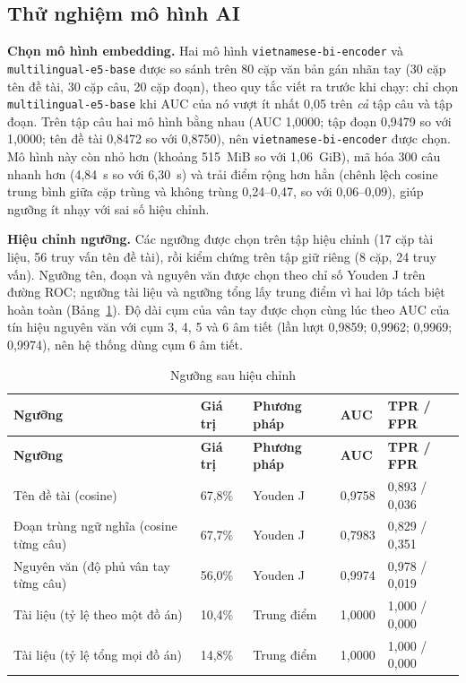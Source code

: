 \documentclass[../main.tex]{subfiles}
\begin{document}
\subsection{Thử nghiệm mô hình AI}

\textbf{Chọn mô hình embedding.} Hai mô hình \texttt{vietnamese-bi-encoder} và \texttt{multilingual-e5-base} được so sánh trên 80 cặp văn bản gán nhãn tay (30 cặp tên đề tài, 30 cặp câu, 20 cặp đoạn), theo quy tắc viết ra trước khi chạy: chỉ chọn \texttt{multilingual-e5-base} khi AUC của nó vượt ít nhất 0,05 trên \textit{cả} tập câu và tập đoạn. Trên tập câu hai mô hình bằng nhau (AUC 1,0000; tập đoạn 0,9479 so với 1,0000; tên đề tài 0,8472 so với 0,8750), nên \texttt{vietnamese-bi-encoder} được chọn. Mô hình này còn nhỏ hơn (khoảng 515~MiB so với 1,06~GiB), mã hóa 300 câu nhanh hơn (4,84~s so với 6,30~s) và trải điểm rộng hơn hẳn (chênh lệch cosine trung bình giữa cặp trùng và không trùng 0,24--0,47, so với 0,06--0,09), giúp ngưỡng ít nhạy với sai số hiệu chỉnh.

\textbf{Hiệu chỉnh ngưỡng.} Các ngưỡng được chọn trên tập hiệu chỉnh (17 cặp tài liệu, 56 truy vấn tên đề tài), rồi kiểm chứng trên tập giữ riêng (8 cặp, 24 truy vấn). Ngưỡng tên, đoạn và nguyên văn được chọn theo chỉ số Youden J trên đường ROC; ngưỡng tài liệu và ngưỡng tổng lấy trung điểm vì hai lớp tách biệt hoàn toàn (Bảng~\ref{tab:c4-nguong}). Độ dài cụm của vân tay được chọn cùng lúc theo AUC của tín hiệu nguyên văn với cụm 3, 4, 5 và 6 âm tiết (lần lượt 0,9859; 0,9962; 0,9969; 0,9974), nên hệ thống dùng cụm 6 âm tiết.

{\renewcommand{\arraystretch}{1.15}
\begin{longtable}{|p{4.3cm}|p{1.7cm}|p{3.1cm}|p{1.6cm}|p{3cm}|}
\caption{Ngưỡng sau hiệu chỉnh}\label{tab:c4-nguong}\\
\hline
\textbf{Ngưỡng} & \textbf{Giá trị} & \textbf{Phương pháp} & \textbf{AUC} & \textbf{TPR / FPR} \\
\hline
\endfirsthead
\hline
\textbf{Ngưỡng} & \textbf{Giá trị} & \textbf{Phương pháp} & \textbf{AUC} & \textbf{TPR / FPR} \\
\hline
\endhead
Tên đề tài (cosine) & 67,8\% & Youden J & 0,9758 & 0,893 / 0,036 \\
\hline
Đoạn trùng ngữ nghĩa (cosine từng câu) & 67,7\% & Youden J & 0,7983 & 0,829 / 0,351 \\
\hline
Nguyên văn (độ phủ vân tay từng câu) & 56,0\% & Youden J & 0,9974 & 0,978 / 0,019 \\
\hline
Tài liệu (tỷ lệ theo một đồ án) & 10,4\% & Trung điểm & 1,0000 & 1,000 / 0,000 \\
\hline
Tài liệu (tỷ lệ tổng mọi đồ án) & 14,8\% & Trung điểm & 1,0000 & 1,000 / 0,000 \\
\hline
\end{longtable}
}
\end{document}
